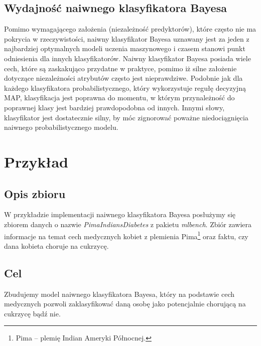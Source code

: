 \documentclass[a4paper]{article}
\begin{document}
\subsection{Wydajność naiwnego klasyfikatora Bayesa}
Pomimo wymagającego założenia (niezależność predyktorów), które często nie ma pokrycia w rzeczywistości, naiwny klasyfikator Bayesa uznawany jest za jeden z najbardziej optymalnych modeli uczenia maszynowego i czasem stanowi punkt odniesienia dla innych klasyfikatorów. Naiwny klasyfikator Bayesa posiada wiele cech, które są zaskakująco przydatne w praktyce, pomimo iż silne założenie dotyczące niezależności atrybutów często jest nieprawdziwe. Podobnie jak dla każdego klasyfikatora probabilistycznego, który wykorzystuje regułę decyzyjną MAP, klasyfikacja jest poprawna do momentu, w którym przynależność do poprawnej klasy jest bardziej prawdopodobna od innych. Innymi słowy, klasyfikator jest dostatecznie silny, by móc zignorować poważne niedociągnięcia naiwnego probabilistycznego modelu. 

\newpage
\section{Przykład}
\subsection{Opis zbioru}
W przykładzie implementacji naiwnego klasyfikatora Bayesa posłużymy się zbiorem danych o nazwie \textit{PimaIndiansDiabetes} z pakietu \textit{mlbench}. Zbiór zawiera informacje na temat cech medycznych kobiet z plemienia Pima\footnote{Pima -- plemię Indian Ameryki Północnej.} oraz faktu, czy dana kobieta choruje na cukrzycę.
\subsection{Cel}
Zbudujemy model naiwnego klasyfikatora Bayesa, który na podstawie cech medycznych pozwoli zaklasyfikować daną osobę jako potencjalnie chorującą na cukrzycę bądź nie.
\end{document}
